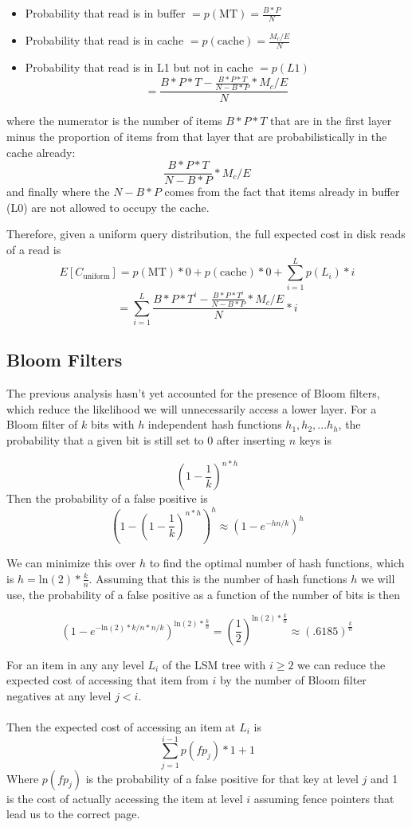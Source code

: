 \documentclass{cidr-2019}
\begin{document}
\begin{itemize}
\item Probability that read is in buffer $= p(\text{MT}) = \frac{B*P}{N}$
\item Probability that read is in cache $= p(\text{cache}) = \frac{M_c/E}{N}$
\item Probability that read is in L1 but not in cache $= p(L1)$ $$= \frac{B*P * T - \frac{B*P*T}{N-B*P} * M_c/E}{N}$$
\end{itemize}

where the numerator is the number of items $B*P*T$ that are in the first layer
minus the proportion of items from that layer that are probabilistically in the
cache already: $$\frac{B*P*T}{N-B*P} * M_c/E$$ and finally where the $N-B*P$
comes from the fact that items already in buffer (L0) are not allowed to
occupy the cache.

Therefore, given a uniform query distribution, the full expected cost in disk
reads of a read is
$$E[C_{\text{uniform}}] = p(\text{MT}) * 0  + p(\text{cache}) * 0 + \sum_{i=1}^L p(L_i) * i$$
$$=\sum_{i=1}^L \frac{B*P * T^i - \frac{B*P*T^i}{N-B*P} * M_c/E}{N} * i$$


\subsection{Bloom Filters}

The previous analysis hasn't yet accounted for the presence of Bloom filters,
which reduce the likelihood we will unnecessarily access a lower layer. For a
Bloom filter of $k$ bits with $h$ independent hash functions $h_1, h_2,...h_h$,
the probability that a given bit is still set to 0 after inserting $n$ keys is 

$$
(1 - \frac{1}{k})^{n*h}
$$
Then the probability of a false positive is 
$$
(1- (1 - \frac{1}{k})^{n*h})^h \approx (1 - e^{-hn/k})^h
$$

We can minimize this over $h$ to find the optimal number of hash functions,
which is $h = \mathrm{ln}(2) * \frac{k}{n}$. Assuming that this is the number
of hash functions $h$ we will use, the probability of a false positive as a
function of the number of bits is then 

$$
(1 - e^{-\mathrm{ln}(2)*k/n*n/k})^{\mathrm{ln}(2) * \frac{k}{n}} = (\frac{1}{2}) ^ {\mathrm{ln}(2) * \frac{k}{n}} \approx (.6185) ^  {\frac{k}{n}}
$$

For an item in any any level $L_i$ of the LSM tree with $i \geq 2$ we can
reduce the expected cost of accessing that item from $i$ by the number of Bloom
filter negatives at any level $j<i$. \\ \\ Then the expected cost of accessing
an item at $L_i$ is  $$\sum_{j=1}^{i-1} p(fp_j) * 1 + 1$$ Where $p(fp_j)$ is
the probability of a false positive for that key at level $j$ and 1 is the cost
of actually accessing the item at level $i$ assuming fence pointers that lead
us to the correct page.
\end{document}
